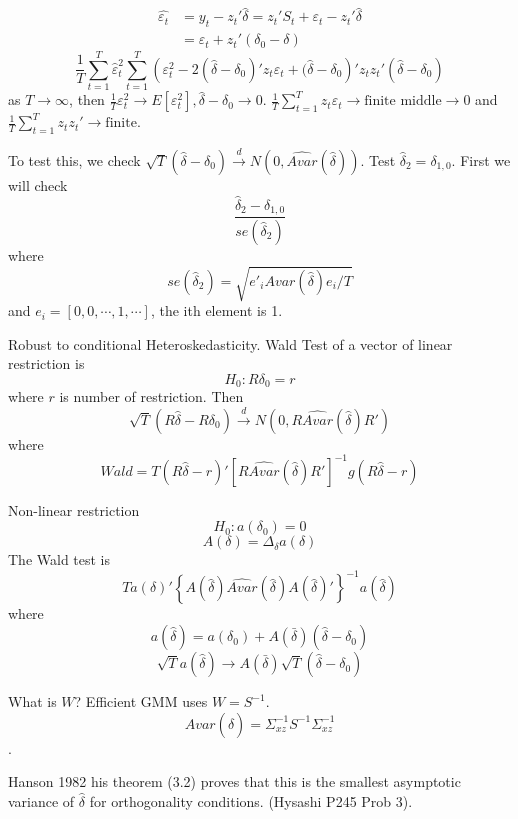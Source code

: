\documentclass[11pt, a4paper, oneside]{article}
\theoremstyle{definition}
\theoremstyle{proposition}
\theoremstyle{corollary}
\theoremstyle{lemma}
\theoremstyle{theorem}
\begin{document}
\begin{align*}
\hat{\varepsilon_t} &= y_t - z_t'\hat{\delta} = z_t' S_t + \varepsilon_t - z_t'\hat{\delta}\\ 
&= \varepsilon_t  + z_t'(\delta_0 -  \delta)
\end{align*}
$$\frac{1}{T}\sum_{t=1}^T \hat{\varepsilon}_t^2  \sum_{t=1}^T \left(\varepsilon_t^2 - 2(\hat{\delta} - \delta_0)'z_t\varepsilon_t +(\hat{\delta}- \delta_0\right)'z_tz_t'(\hat{\delta} - \delta_0)$$
as $T\to\infty$, then $\frac{1}{T} \varepsilon_t^2 \to E[\varepsilon_t^2], \hat{\delta}- \delta_0 \to 0$. $\frac{1}{T}\sum_{t =1}^T z_t \varepsilon_t \to \text{finite middle} \to 0$ and $\frac{1}{T}\sum_{t=1}^T z_tz_t' \to \text{finite}$. 

To test this, we check $\sqrt{T} (\hat{\delta} - \delta _0) \overset{d}{\to} N(0, \hat{Avar}(\hat{\delta}))$. Test $\hat{\delta}_2 = \delta_{1, 0}$. First we will check
$$\frac{\hat{\delta}_2 - \delta_{1, 0}}{se(\hat{\delta}_2)}$$ 
where $$se(\hat{\delta}_2) = \sqrt{e'_iAvar(\hat{\delta})e_i/T}$$ and $e_i = [0, 0, \cdots, 1, \cdots]$, the ith element is 1. 

Robust to conditional Heteroskedasticity. Wald Test of a vector of linear restriction is 
$$H_0: R\delta_0 = r$$ where $r$ is number of restriction. Then
$$\sqrt{T}(R \hat{\delta} - R\delta_0) \overset{d}{\to} N(0, R\hat{Avar}(\hat{\delta})R')$$
where $$Wald=T(R\hat{\delta} - r)'\left[R\hat{Avar}(\hat{\delta})R'\right]^{-1}g(R\hat{\delta}- r)$$

Non-linear restriction
$$H_0: a(\delta_0) = 0$$
$$A(\delta) = \Delta_{\delta} a(\delta)$$
The Wald test is $$Ta(\delta)'\left\{A(\hat{\delta})\hat{Avar}(\hat{\delta})A(\hat{\delta})'\right\}^{-1}a(\hat{\delta})$$
where $$a(\hat{\delta}) = a(\delta_0) + A(\bar{\delta})(\hat{\delta} -\delta_0)$$
$$\sqrt{T}a(\hat{\delta}) \to A(\bar{\delta}) \sqrt{T}(\hat{\delta} -  \delta_0)$$

What is $W$? Efficient GMM uses $W= S^{-1}$. $$Avar(\hat{\delta}) = \Sigma_{xz}^{-1}S^{-1}\Sigma_{xz}^{-1}$$. 

Hanson 1982 his theorem (3.2) proves that this is the smallest asymptotic variance of $\hat{\delta}$ for orthogonality conditions. (Hysashi P245 Prob 3). 
\end{document}

